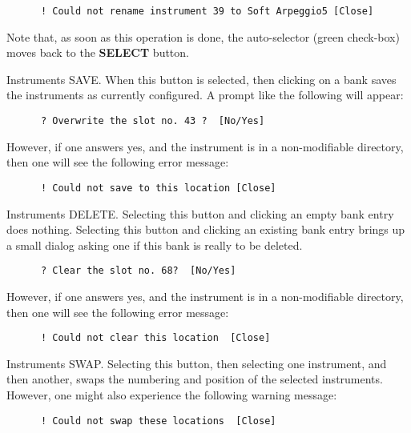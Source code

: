    \begin{verbatim}
      ! Could not rename instrument 39 to Soft Arpeggio5 [Close]
   \end{verbatim}

   Note that, as soon as this operation is done, the auto-selector (green
   check-box) moves back to the \textbf{SELECT} button.

   Instruments SAVE.
   When this button is selected, then clicking on a bank saves
   the instruments as currently configured.
   A prompt like the following will appear:

   \begin{verbatim}
      ? Overwrite the slot no. 43 ?  [No/Yes]
   \end{verbatim}

   However, if one answers yes, and the instrument is in a non-modifiable
   directory, then one will see the following error message:

   \begin{verbatim}
      ! Could not save to this location [Close]
   \end{verbatim}

   Instruments DELETE.
   Selecting this button and clicking an empty bank entry does nothing.
   Selecting this button and clicking an existing bank entry brings up a
   small dialog asking one if this bank is really to be deleted.

   \begin{verbatim}
      ? Clear the slot no. 68?  [No/Yes]
   \end{verbatim}

   However, if one answers yes, and the instrument is in a non-modifiable
   directory, then one will see the following error message:

   \begin{verbatim}
      ! Could not clear this location  [Close]
   \end{verbatim}

   Instruments SWAP.
   Selecting this button, then selecting one instrument, and then another,
   swaps the numbering and position of the selected instruments.
   However, one might also experience the following warning message:

   \begin{verbatim}
      ! Could not swap these locations  [Close]
   \end{verbatim}

